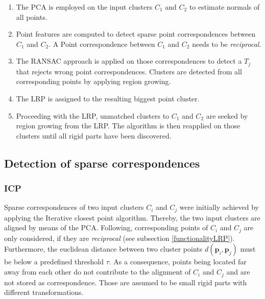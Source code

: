 \begin{enumerate}
	\item The PCA is employed on the input clusters $C_1$ and $C_2$ to estimate normals of all points.
	\item Point features are computed to detect sparse point correspondences between $C_1$ and $C_2$. A Point correspondence between $C_1$ and $C_2$ needs to be \textit{reciprocal}.
	\item The RANSAC approach is applied on those correspondences to detect a $T_j$ that rejects wrong point correspondences. Clusters are detected from all corresponding points by applying region growing.
	\item The LRP is assigned to the resulting biggest point cluster.
	\item Proceeding with the LRP, unmatched clusters to $C_1$ and $C_2$ are seeked by region growing from the LRP. The algorithm is then reapplied on those clusters until all rigid parts have been discovered.
\end{enumerate}

\subsection{Detection of sparse correspondences}
\label{correspondences}

\subsubsection{ICP}
Sparse correspondences of two input clusters $C_i$ and $C_j$ were initially achieved by applying the Iterative closest point algorithm. Thereby, the two input clusters are aligned by means of the PCA. Following, corresponding points of $C_i$ and $C_j$ are only considered, if they are \textit{reciprocal} (see subsection \ref{functionalityLRP}). Furthermore, the euclidean distance between two cluster points $d(\boldsymbol{p}_i,\boldsymbol{p}_j)$ must be below a predefined threshold $\tau$. As a consequence, points being located far away from each other do not contribute to the alignment of $C_i$ and $C_j$ and are not stored as correspondence. Those are assumed to be small rigid parts with different transformations.

